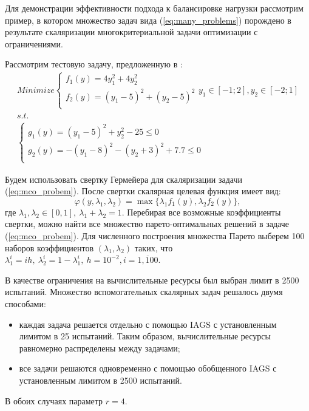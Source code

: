 Для демонстрации эффективности подхода к балансировке нагрузки рассмотрим пример,
в котором множество задач вида (\ref{eq:many_problems}) порождено в результате скаляризации
многокритериальной задачи оптимизации с ограничениями.

Рассмотрим тестовую задачу, предложенную в \cite{BinhKorn1999}:
\begin{equation}
  \label{eq:mco_probem}
  \begin{array}{l}
      Minimize \left \{
      \begin{array}{l}
        f_1(y) = 4 y_1^2 + 4 y_2^2 \\
        f_2(y) = (y_1-5)^2 + (y_2-5)^2 \\
      \end{array}
      \right .
      y_1\in [-1;2],y_2\in [-2;1]
      \\s.t.
      \\
      \left \{
      \begin{array}{l}
        g_1(y) = (y_1 - 5)^2 + y_2^2 - 25 \leqslant 0 \\
        g_2(y) = -(y_1 - 8)^2 - (y_2 + 3)^2 + 7.7 \leqslant 0\\
      \end{array}
      \right .
  \end{array}
\end{equation}

Будем использовать свертку Гермейера для скаляризации задачи (\ref{eq:mco_probem}).
После свертки скалярная целевая функция имеет вид:
\begin{equation}
  \varphi(y,\lambda_1,\lambda_2)=\max\{\lambda_1 f_1(y), \lambda_2 f_2(y)\},
\end{equation}
где \(\lambda_1,\lambda_2\in[0,1],\: \lambda_1+\lambda_2=1\). Перебирая все возможные
коэффициенты свертки, можно найти все множество парето-оптимальных решений в
задаче (\ref{eq:mco_probem}). Для численного построения множества Парето выберем
100 наборов коэффициентов \((\lambda_1,\lambda_2)\) таких, что
\(\lambda_1^i=i h,\: \lambda_2^i=1-\lambda_1^i,\: h=10^{-2},i=\overline{1, 100}\).

В качестве ограничения на вычислительные ресурсы был выбран лимит в 2500 испытаний.
Множество вспомогательных скалярных задач решалось двумя способами:
\begin{itemize}
  \item каждая задача решается отдельно с помощью IAGS с установленным лимитом в
  25 испытаний. Таким образом, вычислительные ресурсы равномерно распределены между задачами;
  \item все задачи решаются одновременно с помощью обобщенного IAGS с установленным лимитом в
  2500 испытаний.
\end{itemize}
В обоих случаях параметр \(r=4\).

